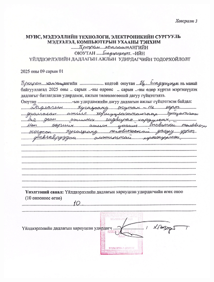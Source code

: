 \begin{figure}
	\centering
	\includegraphics[width=17cm]{images/unelgee.png}
	\label{fig:unelgee}
\end{figure}
\newpage
